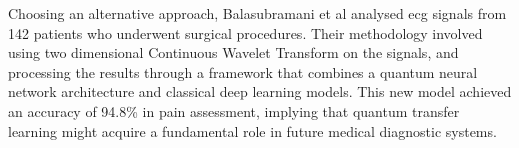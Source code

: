 Choosing an alternative approach, Balasubramani et al \cite{Balasubramani2025} analysed \ac{ecg} signals from 142 patients who underwent surgical procedures. Their methodology involved using two dimensional Continuous Wavelet Transform on the signals, and processing the results through a framework that combines a quantum neural network architecture and classical deep learning models. This new model achieved an accuracy of 94.8\% in pain assessment, implying that quantum transfer learning might acquire a fundamental role in future medical diagnostic systems. 






